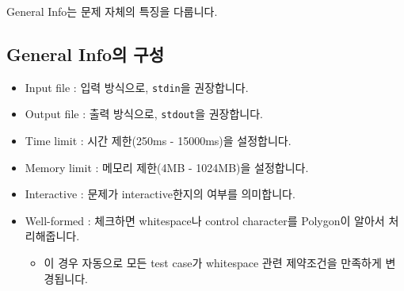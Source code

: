 \documentclass{article}
\begin{document}
    General Info는 문제 자체의 특징을 다룹니다.
    \subsection{General Info의 구성}
    \begin{itemize}
        \item Input file : 입력 방식으로, \verb|stdin|을 권장합니다.
        \item Output file : 출력 방식으로, \verb|stdout|을 권장합니다.
        \item Time limit : 시간 제한(250ms - 15000ms)을 설정합니다.
        \item Memory limit : 메모리 제한(4MB - 1024MB)을 설정합니다.
        \item Interactive : 문제가 interactive한지의 여부를 의미합니다.
        \item Well-formed : 체크하면 whitespace나 control character를 Polygon이 알아서 처리해줍니다.
        \begin{itemize}
            \item 이 경우 자동으로 모든 test case가 whitespace 관련 제약조건을 만족하게 변경됩니다.
        \end{itemize}
    \end{itemize}
\end{document}
